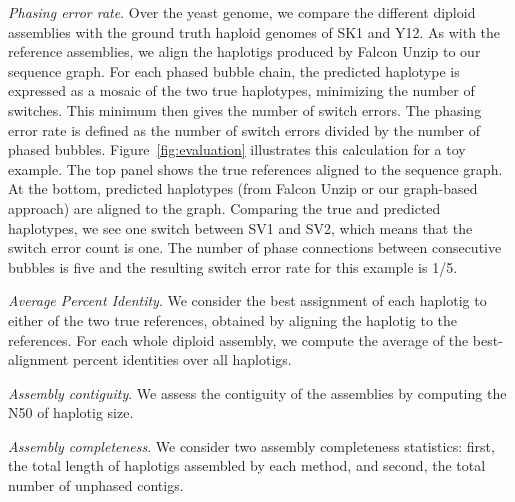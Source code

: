 \textit{Phasing error rate}. Over the yeast genome, we compare the different diploid assemblies with the ground truth haploid genomes of SK1 and Y12.
As with the reference assemblies, we align the haplotigs produced by Falcon Unzip to our sequence graph.
For each phased bubble chain, the predicted haplotype is expressed as a mosaic of the two true haplotypes, minimizing the number of switches. 
This minimum then gives the number of switch errors.
The phasing error rate is defined as the number of switch errors divided by the number of phased bubbles.
Figure~\ref{fig:evaluation} illustrates this calculation for a toy example.  The top panel shows the true references aligned to the sequence graph. At the bottom, predicted haplotypes (from Falcon Unzip or our graph-based approach) are aligned to the graph.
Comparing the true and predicted haplotypes, we see one switch between SV1 and SV2, which means that the switch error count is one. 
The number of phase connections between consecutive bubbles is five and the resulting switch error rate for this example is 1/5.

\textit{Average Percent Identity}. We consider the best assignment of each haplotig to either of the two true references, obtained by aligning the haplotig to the references.
For each whole diploid assembly, we compute the average of the best-alignment percent identities over all haplotigs. 

\textit{Assembly contiguity}. We assess the contiguity of the assemblies by computing the N50 of haplotig size.

\textit{Assembly completeness}. We consider two assembly completeness statistics: first, the total length of haplotigs assembled by each method, and second, the total number of unphased contigs.

